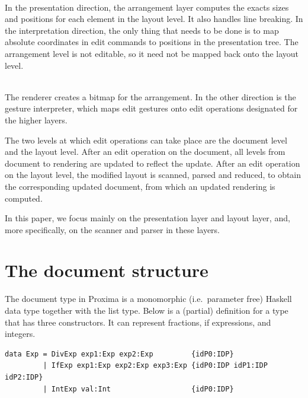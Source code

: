 \documentclass[12pt]{article}
\begin{document}
\\
In the presentation direction, the arrangement layer computes the exacts sizes and positions for each element in the layout level. It also handles line breaking. In the interpretation direction, the only thing that needs to be done is to map absolute coordinates in edit commands to positions in the presentation tree. The arrangement level is not editable, so it need not be mapped back onto the layout level.

\\
The renderer creates a bitmap for the arrangement. In the other direction is the gesture interpreter, which maps edit gestures onto edit operations designated for the higher layers.


The two levels at which edit operations can take place are the document level and the layout level. After an edit operation on the document, all levels from document to rendering are updated to reflect the update. After an edit operation on the layout level, the modified layout is scanned, parsed and reduced, to obtain the corresponding updated document, from which an updated rendering is computed.

In this paper, we focus mainly on the presentation layer and layout layer, and, more specifically, on the scanner and parser in these layers.



%
\section{The document structure}\label{sect:documentStructure}
%

The document type in Proxima is a monomorphic (i.e.\ parameter free) Haskell data type together with the list type. Below is a (partial) definition for a type  that has three constructors. It can represent fractions, if expressions, and integers.

\begin{footnotesize}
\begin{verbatim}
data Exp = DivExp exp1:Exp exp2:Exp         {idP0:IDP}
         | IfExp exp1:Exp exp2:Exp exp3:Exp {idP0:IDP idP1:IDP idP2:IDP}
         | IntExp val:Int                   {idP0:IDP}
\end{verbatim}
\end{footnotesize}
\end{document}
